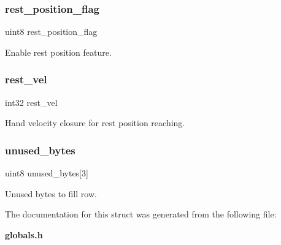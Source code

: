 \subsubsection{rest\+\_\+position\+\_\+flag}
{\footnotesize\ttfamily uint8 rest\+\_\+position\+\_\+flag}

Enable rest position feature. \mbox{\label{structst___s_h__spec_a94cdcf7b401877a792ba800585324d9c}} 
\subsubsection{rest\+\_\+vel}
{\footnotesize\ttfamily int32 rest\+\_\+vel}

Hand velocity closure for rest position reaching. \mbox{\label{structst___s_h__spec_aa1537c1e30116f5e2ee8dee11239a067}} 
\subsubsection{unused\+\_\+bytes}
{\footnotesize\ttfamily uint8 unused\+\_\+bytes[3]}

Unused bytes to fill row. 

The documentation for this struct was generated from the following file\+:\begin{DoxyCompactItemize}
\item 
\textbf{ globals.\+h}\end{DoxyCompactItemize}

